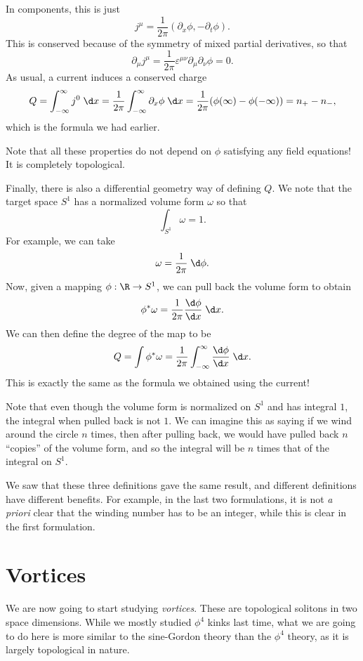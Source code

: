 \documentclass[a4paper]{article}
\begin{document}
In components, this is just
\[
  j^\mu = \frac{1}{2\pi} (\partial_x \phi, - \partial_t \phi).
\]
This is conserved because of the symmetry of mixed partial derivatives, so that
\[
  \partial_\mu j^\mu = \frac{1}{2\pi} \varepsilon^{\mu\nu} \partial_\mu \partial_\nu \phi = 0.
\]
As usual, a current induces a conserved charge
\[
  Q = \int_{-\infty}^\infty j^0 \;\d x = \frac{1}{2\pi} \int_{-\infty}^\infty \partial_x \phi \;\d x = \frac{1}{2\pi} (\phi(\infty) - \phi(-\infty)) = n_+ - n_-,
\]
which is the formula we had earlier.

Note that all these properties do not depend on $\phi$ satisfying any field equations! It is completely topological.

Finally, there is also a differential geometry way of defining $Q$. We note that the target space $S^1$ has a normalized volume form $\omega$ so that
\[
  \int_{S^1} \omega = 1.
\]
For example, we can take
\[
  \omega = \frac{1}{2\pi}\;\d \phi.
\]
Now, given a mapping $\phi: \R \to S^1$, we can pull back the volume form to obtain
\[
  \phi^* \omega = \frac{1}{2\pi} \frac{\d \phi}{\d x} \;\d x.
\]
We can then define the degree of the map to be
\[
  Q = \int \phi^* \omega = \frac{1}{2\pi}\int_{-\infty}^\infty \frac{\d \phi}{\d x}\;\d x.
\]
This is exactly the same as the formula we obtained using the current!

Note that even though the volume form is normalized on $S^1$ and has integral $1$, the integral when pulled back is not $1$. We can imagine this as saying if we wind around the circle $n$ times, then after pulling back, we would have pulled back $n$ ``copies'' of the volume form, and so the integral will be $n$ times that of the integral on $S^1$.

We saw that these three definitions gave the same result, and different definitions have different benefits. For example, in the last two formulations, it is not \emph{a priori} clear that the winding number has to be an integer, while this is clear in the first formulation.

\section{Vortices}
We are now going to start studying \emph{vortices}. These are topological solitons in two space dimensions. While we mostly studied $\phi^4$ kinks last time, what we are going to do here is more similar to the sine-Gordon theory than the $\phi^4$ theory, as it is largely topological in nature.
\end{document}
